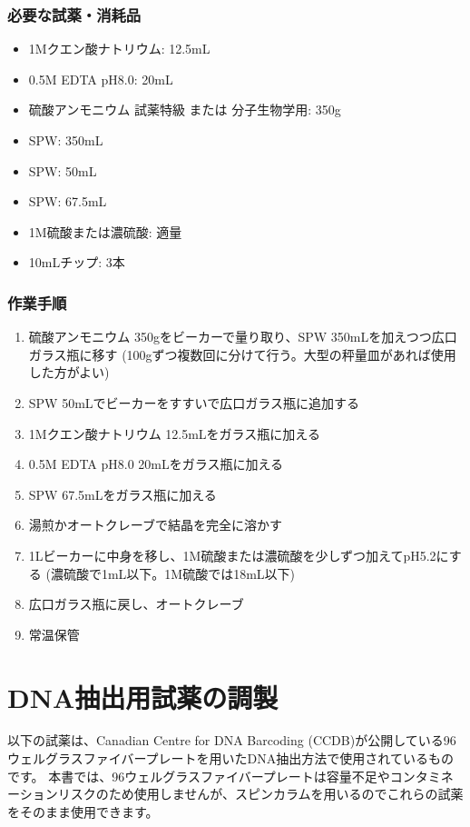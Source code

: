 \documentclass[titlepage,10pt,a4paper,uplatex]{jsbook}
\begin{document}
\subsubsection{必要な試薬・消耗品}
\begin{itemize}
\item 1Mクエン酸ナトリウム: 12.5mL
\item 0.5M EDTA pH8.0: 20mL
\item 硫酸アンモニウム 試薬特級 または 分子生物学用: 350g
\item SPW: 350mL
\item SPW: 50mL
\item SPW: 67.5mL
\item 1M硫酸または濃硫酸: 適量
\item 10mLチップ: 3本
\end{itemize}

\subsubsection{作業手順}
\begin{enumerate}
\item 硫酸アンモニウム 350gをビーカーで量り取り、SPW 350mLを加えつつ広口ガラス瓶に移す (100gずつ複数回に分けて行う。大型の秤量皿があれば使用した方がよい)
\item SPW 50mLでビーカーをすすいで広口ガラス瓶に追加する
\item 1Mクエン酸ナトリウム 12.5mLをガラス瓶に加える
\item 0.5M EDTA pH8.0 20mLをガラス瓶に加える
\item SPW 67.5mLをガラス瓶に加える
\item 湯煎かオートクレーブで結晶を完全に溶かす
\item 1Lビーカーに中身を移し、1M硫酸または濃硫酸を少しずつ加えてpH5.2にする (濃硫酸で1mL以下。1M硫酸では18mL以下)
\item 広口ガラス瓶に戻し、オートクレーブ
\item 常温保管
\end{enumerate}

\section{DNA抽出用試薬の調製}\label{makingDNAextractionbuffers}

以下の試薬は、Canadian Centre for DNA Barcoding (CCDB)が公開している96ウェルグラスファイバープレートを用いたDNA抽出方法\citep{Ivanova2006}で使用されているものです。
本書では、96ウェルグラスファイバープレートは容量不足やコンタミネーションリスクのため使用しませんが、スピンカラムを用いるのでこれらの試薬をそのまま使用できます。
\end{document}
